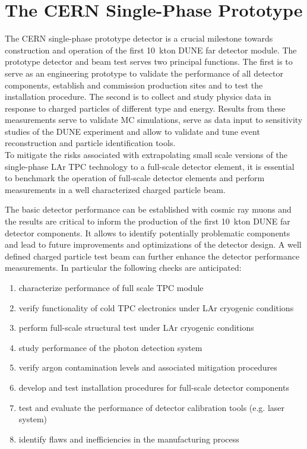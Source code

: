 \section{The CERN Single-Phase Prototype} 
\label{sec:proto-cern-single}


The CERN single-phase prototype detector is a crucial milestone towards construction and operation of the 
first 10~kton DUNE far detector module. The prototype detector and beam test serves two principal functions. 
The first is to serve as an engineering prototype to validate the performance of all detector components,
establish and commission production sites and to test the installation procedure. 
The second is to collect and study physics data in response to charged particles of different type and energy. 
Results from these measurements serve to validate MC simulations, serve as data input to sensitivity studies 
of the DUNE experiment  and allow to validate and tune event reconstruction and particle identification tools.\\
To mitigate the risks associated with extrapolating small scale versions of the single-phase LAr TPC technology 
to a full-scale detector element, it is essential to benchmark the operation of full-scale detector elements
and perform measurements in a well characterized charged particle beam.  


The basic detector performance can be established with cosmic ray muons and the results are critical to inform 
the production of the first 10~kton DUNE far detector components.
It allows to identify potentially problematic components and lead to future improvements and optimizations of the detector design.
A well defined charged particle test beam can further enhance the detector performance measurements.
In particular the following checks are anticipated:
\begin{enumerate}
 \item characterize performance of full scale TPC module
 \item verify functionality of cold TPC electronics under LAr cryogenic conditions
 \item perform full-scale structural test under LAr cryogenic conditions
 \item study performance of the photon detection system
 \item verify argon contamination levels and associated mitigation procedures
 \item develop and test installation procedures for full-scale detector components
 \item test and evaluate the performance of detector calibration tools (e.g. laser system)
 \item identify flaws and inefficiencies in the manufacturing process
\end{enumerate}

